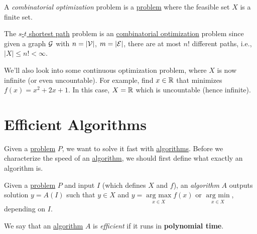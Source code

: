 \begin{definition}\label{def:combinatorial-optimization}
	A \emph{combinatorial optimization} problem is a \hyperref[def:computational-problem]{problem} where the feasible set \(X\) is a finite set.
\end{definition}

\begin{eg}
	The \hyperref[eg:s-t-path]{\(s\)-\(t\) shortest path} problem is an \hyperref[def:combinatorial-optimization]{combinatorial optimization} problem since given a graph \(\mathcal{\MakeUppercase{g}} \) with \(n = \left\vert \mathcal{\MakeUppercase{v}}  \right\vert \), \(m = \left\vert \mathcal{\MakeUppercase{e}}  \right\vert \), there are at most \(n!\) different paths, i.e., \(\left\vert X \right\vert \leq n! < \infty\).
\end{eg}

\begin{note}
	We'll also look into some continuous optimization problem, where \(X\) is now infinite (or even uncountable). For example, find \(x\in \mathbb{\MakeUppercase{r}} \) that minimizes \(f(x)=x^{2} +2x + 1\). In this case, \(X = \mathbb{\MakeUppercase{r}} \) which is uncountable (hence infinite).
\end{note}

\section{Efficient Algorithms}

Given a \hyperref[def:computational-problem]{problem} \(P\), we want to solve it fast with \hyperref[def:algorithm]{algorithms}. Before we characterize the speed of an \hyperref[def:algorithm]{algorithm}, we should first define what exactly an algorithm is.

\begin{definition}[Algorithm]\label{def:algorithm}
	Given a \hyperref[def:computational-problem]{problem} \(P\) and input \(I\) (which defines \(X\) and \(f\)), an \emph{algorithm} \(A\) outputs solution \(y = A(I)\) such that \(y\in X\) and \(y = \underset{x\in X}{\mathop{\arg\ \max}} f(x)\) or \(\underset{x\in X}{\mathop{\arg\ \min}} \), depending on \(I\).
\end{definition}

\begin{definition}[Efficient]\label{def:efficient}
	We say that an \hyperref[def:algorithm]{algorithm} \(A\) is \emph{efficient} if it runs in \textbf{polynomial time}.
\end{definition}

